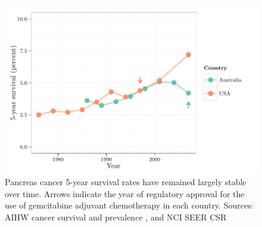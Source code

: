 \documentclass[thesis.tex]{subfiles}
\begin{document}
\begin{figure}[!htbp]
\centering
\includegraphics[width=.9\linewidth]{analysis/intro/figure/historical-survival-pdac-2}
\caption[Historical survival rates of pancreas cancer]{Pancreas cancer 5-year survival rates have remained largely stable over time.  Arrows indicate the year of regulatory approval for the use of gemcitabine adjuvant chemotherapy in each country.  Sources: AIHW cancer survival and prevalence \cite{CAN65}, and NCI SEER CSR \cite{SEER2014}}\label{fig:intro-historical-panc-surv}
\end{figure}

\cite{CAN65}
\end{document}
